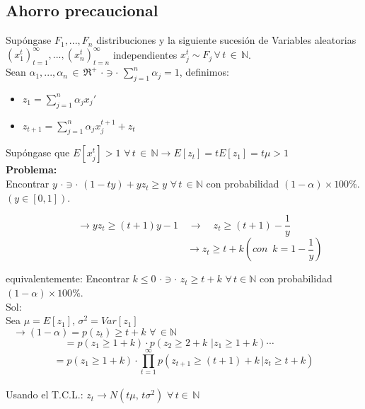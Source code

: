  \subsection{Ahorro precaucional}
\label{sec:ahorro-precaucional}
 Supóngase $F_1,...,F_n$ distribuciones y la siguiente sucesión de Variables aleatorias $(x_1^t)_{t=1}^{\infty},..., (x_n^t)_{t=n}^{\infty}$ independientes $x_j^{t} \sim F_j \,\forall\, t\, \in\, \mathbb{N}$.\\

 Sean $\alpha_1,..., \alpha_n\,\in\,\Re^+\,\, \cdot \ni \cdot \,\,\displaystyle \sum_{j=1}^n\alpha_j=1$, definimos:

 \begin{itemize}
  \item $z_1=\displaystyle \sum_{j=1}^n\alpha_jx_j'$
  \item $z_{t+1}=\displaystyle \sum_{j=1}^n\alpha_jx_j^{t+1}+z_t$
 \end{itemize}
 Supóngase que $E[x_j^t]>1\,\,\forall\,t \,\in\,\mathbb{N}\rightarrow E[z_t]=tE[z_1]=t\mu>1$\\

 {\bf Problema:}\\
 Encontrar $y \,\,\cdot \ni\cdot\,\,(1-ty)+yz_t \ge y\,\,\forall\,t\,\in \mathbb{N}$ con probabilidad $(1-\alpha)\times 100\%$. $(y\in[0,1])$.

 $$\rightarrow y z_t\ge (t+1)y-1\quad\rightarrow\quad z_t\ge(t+1)-\frac{1}{y}$$
 $$\qquad\qquad\qquad\qquad\qquad\qquad\qquad\,\,\rightarrow z_t\ge t+k (con\,\,\,k=1-\frac{1}{y})$$

 equivalentemente: Encontrar $k\le 0\,\,\cdot\ni\cdot\,\,z_t\ge t+k\,\,\forall\,t\in\mathbb{N}$ con probabilidad $(1-\alpha)\times 100\%$.\\

 Sol: \\
 Sea $\mu=E[z_1]$, $\sigma^2=Var[z_1]$\\

 \[\rightarrow (1-\alpha)=p(z_t)\ge t+k\,\,\forall\,\in\mathbb{N}\qquad\qquad\qquad\qquad\qquad\qquad\qquad\qquad\quad\quad\]
 \[=p(z_1\ge 1+k)\cdot p(z_2\ge 2+k\,\,|z_1\ge 1+k)\cdots\qquad\quad\]
 \[=p(z_1\ge 1+k)\cdot\displaystyle\prod_{t=1}^{\infty}p(z_{t+1}\ge (t+1)+k\,|z_t\ge t+k)\]\\

 Usando el T.C.L.: $z_t \rightarrow N(t\mu,\,t\sigma^2)\,\,\forall\,t\in\,\mathbb{N}$

